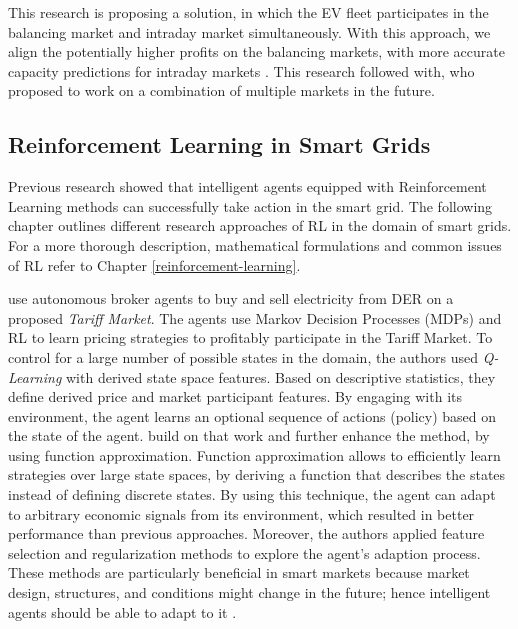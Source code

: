 \documentclass[12pt, article]{article}
\begin{document}
This research is proposing a solution, in which the EV fleet participates in the
balancing market and intraday market simultaneously. With this approach, we
align the potentially higher profits on the balancing markets, with more
accurate capacity predictions for intraday markets
\parencite{tomic07_using_fleet_elect_drive_vehic_grid_suppor}. This research followed
\textcite{kahlen17_fleet} with, who proposed to work on a combination of multiple
markets in the future.

\subsection{Reinforcement Learning in Smart Grids}
\label{sec:org5410004}

Previous research showed that intelligent agents equipped with Reinforcement
Learning methods can successfully take action in the smart grid. The following
chapter outlines different research approaches of RL in the domain of smart
grids. For a more thorough description, mathematical formulations and common
issues of RL refer to Chapter \ref{reinforcement-learning}.

\textcite{reddy11_learn_behav_multip_auton_agent,reddy11_strat} use autonomous
broker agents to buy and sell electricity from DER on a proposed \emph{Tariff
Market}. The agents use Markov Decision Processes (MDPs) and RL to learn pricing
strategies to profitably participate in the Tariff Market. To control for a
large number of possible states in the domain, the authors used \emph{Q-Learning}
with derived state space features. Based on descriptive statistics, they define
derived price and market participant features. By engaging with its environment,
the agent learns an optional sequence of actions (policy) based on the state of
the agent. \textcite{peters13_reinf_learn_approac_to_auton} build on that work and
further enhance the method, by using function approximation. Function
approximation allows to efficiently learn strategies over large state spaces, by
deriving a function that describes the states instead of defining discrete
states. By using this technique, the agent can adapt to arbitrary economic
signals from its environment, which resulted in better performance than previous
approaches. Moreover, the authors applied feature selection and regularization
methods to explore the agent's adaption process. These methods are particularly
beneficial in smart markets because market design, structures, and conditions
might change in the future; hence intelligent agents should be able to adapt to
it \parencite{peters13_reinf_learn_approac_to_auton}.
\end{document}
